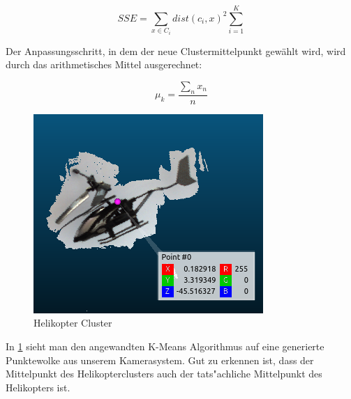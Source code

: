 \begin{equation}
SSE=\sum_{x \in C_i} dist(c_i, x)^{2} \sum_{i=1}^K
\end{equation}

\noindent Der Anpassungsschritt, in dem der neue Clustermittelpunkt gewählt wird, wird durch das arithmetisches Mittel ausgerechnet:

\begin{equation}
\mu_k = \dfrac{\sum_{n}x_{n}}{n}
\end{equation}

\begin{figure}[H]
	\includegraphics[scale=0.75]{bilder/helicloud}
	\caption[Helikopter Cluster]{Helikopter Cluster}
	\label{fig:helimeans}%
\end{figure}

\noindent In \ref{fig:helimeans} sieht man den angewandten K-Means Algorithmus auf eine generierte Punktewolke aus unserem Kamerasystem. Gut zu erkennen ist, dass der Mittelpunkt des Helikopterclusters auch der tats"achliche Mittelpunkt des Helikopters ist.

